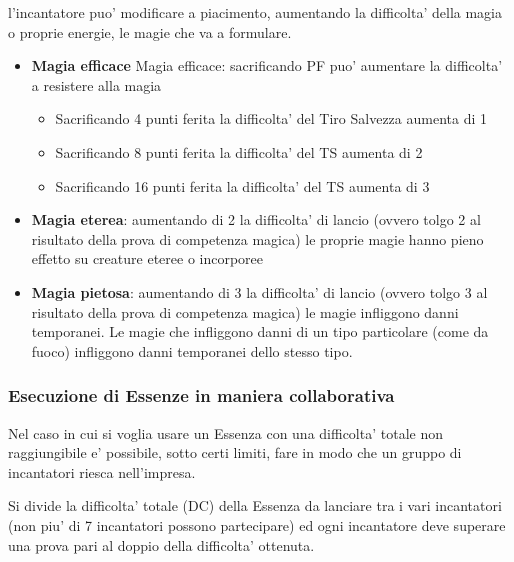 \documentclass[a4paper,11pt,twoside,openany]{book}
\begin{document}
\label{alterare-le-essenze}

l'incantatore puo' modificare a piacimento, aumentando la difficolta' della magia o proprie energie, le magie che va a formulare.

\begin{itemize}
\item 
\textbf{Magia efficace} 
Magia efficace: sacrificando PF puo’ aumentare la difficolta’ a resistere alla magia
\begin{itemize}
	\item Sacrificando 4 punti ferita la difficolta’ del Tiro Salvezza aumenta di 1
	\item Sacrificando 8 punti ferita la difficolta’ del TS aumenta di 2

	\item Sacrificando 16 punti ferita la difficolta’ del TS aumenta di 3
\end{itemize}
\end{itemize}
%
\begin{itemize}
\item 
\textbf{Magia eterea}: aumentando di 2 la difficolta' di lancio (ovvero tolgo 2 al risultato della prova di competenza magica) le proprie magie hanno pieno effetto su creature eteree o incorporee 
\end{itemize}
%
\begin{itemize}
\item 
\textbf{Magia pietosa}: aumentando di 3 la difficolta' di lancio (ovvero tolgo 3 al risultato della prova di competenza magica) le magie infliggono danni temporanei. Le magie che infliggono danni di un tipo particolare (come da fuoco) infliggono danni temporanei dello stesso tipo. 
\end{itemize}

\subsubsection{Esecuzione di Essenze in maniera collaborativa}

Nel caso in cui si voglia usare un Essenza con una difficolta' totale non raggiungibile e' possibile, sotto certi limiti, fare in modo che un gruppo di incantatori riesca nell'impresa.

Si divide la difficolta' totale (DC) della Essenza da lanciare tra i vari incantatori (non piu' di 7 incantatori possono partecipare) ed ogni incantatore deve superare una prova pari al doppio della difficolta' ottenuta.
\end{document}

